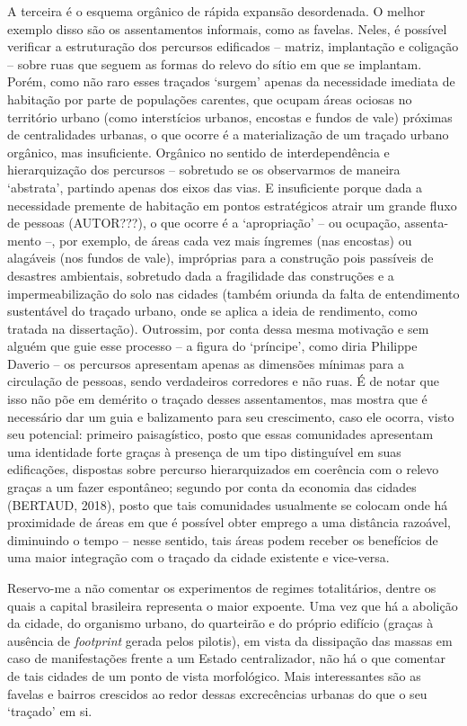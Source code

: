 \documentclass[twoside, 12pt]{book}
\begin{document}
        A terceira é o esquema orgânico de rápida expansão desordenada. O melhor exemplo disso são os assentamentos informais, como as favelas. Neles, é possível verificar a estruturação dos percursos edificados – matriz, implantação e coligação – sobre ruas que seguem as formas do relevo do sítio em que se implantam. Porém, como não raro esses traçados ‘surgem’ apenas da necessidade imediata de habitação por parte de populações carentes, que ocupam áreas ociosas no território urbano (como interstícios urbanos, encostas e fundos de vale) próximas de centralidades urbanas,  o que ocorre é a materialização de um traçado urbano orgânico, mas insuficiente. Orgânico no sentido de interdependência e hierarquização dos percursos – sobretudo se os observarmos de maneira ‘abstrata’, partindo apenas dos eixos das vias. E insuficiente porque dada a necessidade premente de habitação em pontos estratégicos atrair um grande fluxo de pessoas (AUTOR???), o que ocorre é a ‘apropriação’ – ou ocupação, assenta-mento –, por exemplo, de áreas cada vez mais íngremes (nas encostas) ou alagáveis (nos fundos de vale), impróprias para a construção pois passíveis de desastres ambientais, sobretudo dada a fragilidade das construções e a impermeabilização do solo nas cidades (também oriunda da falta de entendimento sustentável do traçado urbano, onde se aplica a ideia de rendimento, como tratada na dissertação). Outrossim, por conta dessa mesma motivação e sem alguém que guie esse processo – a figura do ‘príncipe’, como diria Philippe Daverio – os percursos apresentam apenas as dimensões mínimas para a circulação de pessoas, sendo verdadeiros corredores e não ruas. É de notar que isso não põe em demérito o traçado desses assentamentos, mas mostra que é necessário dar um guia e balizamento para seu crescimento, caso ele ocorra, visto seu potencial: primeiro paisagístico, posto que essas comunidades apresentam uma identidade forte graças à presença de um tipo distinguível em suas edificações,  dispostas sobre percurso hierarquizados em coerência com o relevo graças a um fazer espontâneo; segundo por conta da economia das cidades (BERTAUD, 2018), posto que tais comunidades usualmente se colocam onde há proximidade de áreas em que é possível obter emprego a uma distância razoável, diminuindo o tempo – nesse sentido, tais áreas podem receber os benefícios de uma maior integração com o traçado da cidade existente e vice-versa.

        Reservo-me a não comentar os experimentos de regimes totalitários, dentre os quais a capital brasileira representa o maior expoente. Uma vez que há a abolição da cidade, do organismo urbano, do quarteirão e do próprio edifício (graças à ausência de \textit{footprint} gerada pelos pilotis), em vista da dissipação das massas em caso de manifestações frente a um Estado centralizador, não há o que comentar de tais cidades de um ponto de vista morfológico. Mais interessantes são as favelas e bairros crescidos ao redor dessas excrecências urbanas do que o seu ‘traçado’ em si.
\end{document}

